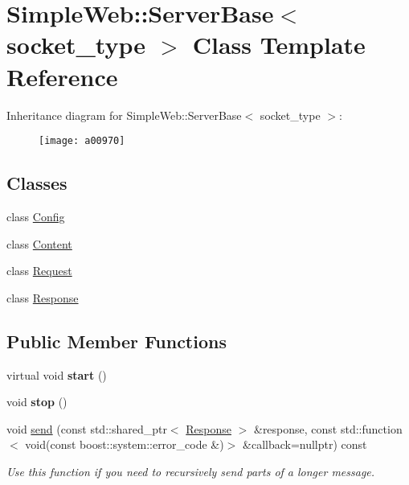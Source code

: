 \hypertarget{a00970}{}\section{Simple\+Web\+:\+:Server\+Base$<$ socket\+\_\+type $>$ Class Template Reference}
\label{a00970}
Inheritance diagram for Simple\+Web\+:\+:Server\+Base$<$ socket\+\_\+type $>$\+:\begin{figure}[H]
\begin{center}
\leavevmode
\texttt{[image: a00970]}
\end{center}
\end{figure}
\subsection*{Classes}
\begin{DoxyCompactItemize}
\item 
class \hyperlink{a00986}{Config}
\item 
class \hyperlink{a00978}{Content}
\item 
class \hyperlink{a00982}{Request}
\item 
class \hyperlink{a00974}{Response}
\end{DoxyCompactItemize}
\subsection*{Public Member Functions}
\begin{DoxyCompactItemize}
\item 
\mbox{\label{a00970_a759d6dae5fa77c47a36f7355fd33f8f7}} 
virtual void {\bfseries start} ()
\item 
\mbox{\label{a00970_a0667e44595f6c23016bee67c646ccc85}} 
void {\bfseries stop} ()
\item 
\mbox{\label{a00970_a93fd842b1a02dd63716ff0718f6069ce}} 
void \hyperlink{a00970_a93fd842b1a02dd63716ff0718f6069ce}{send} (const std\+::shared\+\_\+ptr$<$ \hyperlink{a00974}{Response} $>$ \&response, const std\+::function$<$ void(const boost\+::system\+::error\+\_\+code \&)$>$ \&callback=nullptr) const
\begin{DoxyCompactList}\small\item\em Use this function if you need to recursively send parts of a longer message. \end{DoxyCompactList}\end{DoxyCompactItemize}
